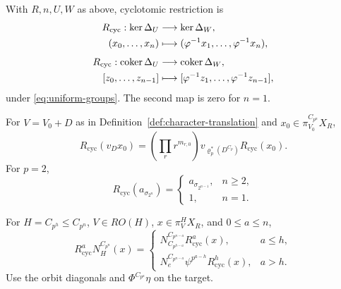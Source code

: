 \begin{proposition}\label{prop:cyclotomic-operations}
With $R,n,U,W$ as above, cyclotomic restriction is
\[
\begin{aligned}
R_{\mathrm{cyc}}:\ker\Delta_U
&\longrightarrow\ker\Delta_W,\\
(x_0,\ldots,x_n)
&\longmapsto
(\varphi^{-1}x_1,\ldots,\varphi^{-1}x_n),\\[4pt]
R_{\mathrm{cyc}}:\operatorname{coker}\Delta_U
&\longrightarrow\operatorname{coker}\Delta_W,\\
[z_0,\ldots,z_{n-1}]
&\longmapsto
[\varphi^{-1}z_1,\ldots,\varphi^{-1}z_{n-1}],
\end{aligned}
\]
under \eqref{eq:uniform-groups}.
The second map is zero for $n=1$.

For $V=V_0+D$ as in
Definition~\ref{def:character-translation} and
$x_0\in\pi_{V_0}^{C_{p^n}}X_R$,
\[
R_{\mathrm{cyc}}(v_Dx_0)
=
\left(\prod_r r^{m_{r,0}}\right)
v_{\varrho_p^*(D^{C_p})}R_{\mathrm{cyc}}(x_0).
\]
For $p=2$,
\[
R_{\mathrm{cyc}}(a_{\sigma_{2^n}})
=
\begin{cases}
a_{\sigma_{2^{n-1}}},&n\ge2,\\
1,&n=1.
\end{cases}
\]

For $H=C_{p^h}\le C_{p^n}$, $V\in RO(H)$,
$x\in\pi_V^H X_R$, and $0\le a\le n$,
\begin{equation}\label{eq:all-cyclotomic-crossings}
R_{\mathrm{cyc}}^aN_H^{C_{p^n}}(x)
=
\begin{cases}
N_{C_{p^{h-a}}}^{C_{p^{n-a}}}
R_{\mathrm{cyc}}^a(x),&a\le h,\\
N_e^{C_{p^{n-a}}}\psi^{p^{a-h}}
R_{\mathrm{cyc}}^h(x),&a>h.
\end{cases}
\end{equation}
Use the orbit diagonals and $\Phi^{C_{p^a}}\eta$ on the target.
\end{proposition}

